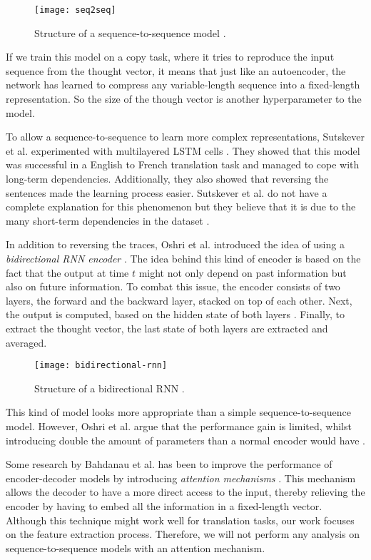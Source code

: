 \begin{figure}[ht]
  \centering
  \texttt{[image: seq2seq]}
  \caption{Structure of a sequence-to-sequence model \cite{britz_2016_1}.}
  \label{fig:seq2seq}
\end{figure}

If we train this model on a copy task, where it tries to reproduce the input sequence from the thought vector, it means that just like an autoencoder,
the network has learned to compress any variable-length sequence into a fixed-length representation.
So the size of the though vector is another hyperparameter to the model.

To allow a sequence-to-sequence to learn more complex representations, Sutskever et al. experimented with multilayered LSTM cells \cite{sutskever_vinyals_le}.
They showed that this model was successful in a English to French translation task and managed to cope with long-term dependencies.
Additionally, they also showed that reversing the sentences made the learning process easier.
Sutskever et al. do not have a complete explanation for this phenomenon but they believe that it is due to the many short-term dependencies in the dataset \cite{sutskever_vinyals_le}.

In addition to reversing the traces, Oshri et al. introduced the idea of using a \textit{bidirectional RNN encoder} \cite{rnnencoder}.
The idea behind this kind of encoder is based on the fact that the output at time $t$ might not only depend on past information but also on future information.
To combat this issue, the encoder consists of two layers, the forward and the backward layer, stacked on top of each other.
Next, the output is computed, based on the hidden state of both layers \cite{britz_2016}.
Finally, to extract the thought vector, the last state of both layers are extracted and averaged.

\begin{figure}[ht]
  \centering
  \texttt{[image: bidirectional-rnn]}
  \caption{Structure of a bidirectional RNN \cite{britz_2016}.}
  \label{fig:bidirectional-rnn}
\end{figure}

\newpage

This kind of model looks more appropriate than a simple sequence-to-sequence model.
However, Oshri et al. argue that the performance gain is limited, whilst introducing double the amount of parameters than a normal encoder would have \cite{rnnencoder}.

Some research by Bahdanau et al. has been to improve the performance of encoder-decoder models by introducing \textit{attention mechanisms} \cite{attention_mechanisms}.
This mechanism allows the decoder to have a more direct access to the input, thereby relieving the encoder by having to embed all the information in a fixed-length vector.
Although this technique might work well for translation tasks, our work focuses on the feature extraction process.
Therefore, we will not perform any analysis on sequence-to-sequence models with an attention mechanism.

